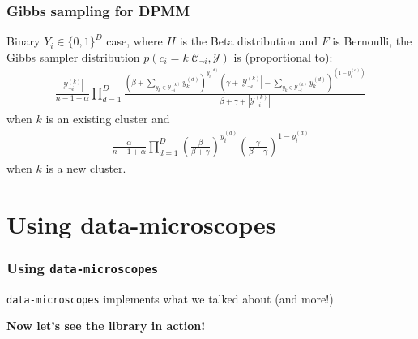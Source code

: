 \documentclass{beamer}
\newcommand{\Y}{\ensuremath{\mathcal{Y}}}
\newcommand{\C}{\ensuremath{\mathcal{C}}}
\begin{document}
\begin{frame}
\frametitle{Gibbs sampling for DPMM}
Binary $Y_i \in \{0,1\}^{D}$ case, where $H$ is the Beta distribution and $F$
is Bernoulli, the Gibbs sampler distribution $p(c_i{=}k | \C_{\neg i}, \Y)$ is
(proportional to): \pause
\begin{align*}
  \frac{ |\Y^{(k)}_{\neg i}| }{ n - 1 + \alpha } \prod_{d=1}^{D} \frac{\left(\beta+\sum_{y_k\in \Y^{(k)}_{\neg i}} y_k^{(d)}\right)^{y_i^{(d)}} \left(  \gamma + |\Y^{(k)}_{\neg i}| - \sum_{y_k\in \Y^{(k)}_{\neg i}} y_k^{(d)}\right)^{(1-y_i^{(d)})} }{ \beta + \gamma + |\Y^{(k)}_{\neg i}| }
\end{align*}
when $k$ is an existing cluster and 
\pause
\begin{align*}
  \frac{ \alpha }{ n - 1 + \alpha } \prod_{d=1}^{D} \left(\frac{\beta}{\beta+\gamma}\right)^{y_i^{(d)}} \left(\frac{\gamma}{\beta+\gamma}\right)^{1-y_i^{(d)}}
\end{align*}
when $k$ is a new cluster.
\end{frame}


\section{Using data-microscopes}

\begin{frame}
\frametitle{Using \texttt{data-microscopes}}
\pause
\texttt{data-microscopes} implements what we talked about (and more!) 
\newline
\newline
\pause

\textbf{Now let's see the library in action!}
\end{frame}

%
%
\end{document}
